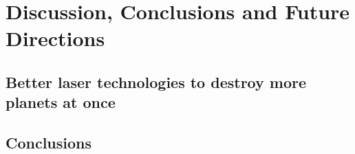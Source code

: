 \chapter{Discussion, Conclusions and Future Directions}\label{chp:future}
\section{Better laser technologies to destroy more planets at once}\label{chp:future:laser}
\section{Conclusions}\label{chp:future:conclusion}
